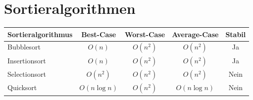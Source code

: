 \chapter{Sortieralgorithmen}
\begin{center}  
\begin{tabular}{|p{3.2cm}|c|c|c|c|}
    \hline
    Sortieralgorithmus & Best-Case &
    Worst-Case & Average-Case &
    Stabil \\
    \hline
    Bubblesort & $O(n)$ & $O(n^2)$ & $O(n^2)$ & Ja \\
    \hline
    Insertionsort & $O(n)$ & $O(n^2)$ & $O(n^2)$ & Ja \\
    \hline
    Selectionsort & $O(n^2)$ & $O(n^2)$ & $O(n^2)$ & Nein \\
    \hline
    Quicksort & $O(n\log n)$ & $O(n^2)$ & $O(n\log n)$ & Nein \\
    \hline
\end{tabular}
\end{center}

\begin{center}
\end{center}

